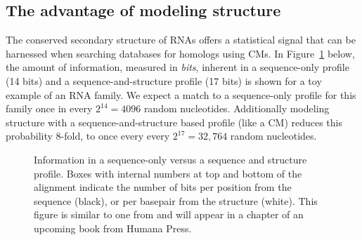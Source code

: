 \documentclass[custom,landscape,final,30pt,plainboxedsections]{sciposter-titleskipsmall}
\begin{document}
\begin{multicols}{3}
\columnbreak

\section*{The advantage of modeling structure} 
The conserved secondary structure of RNAs offers a
statistical signal that can be harnessed when searching
databases for homologs using CMs. In
Figure~\ref{fig:seqstructprofiles} below, the amount of information,
measured in \emph{bits}, inherent in a sequence-only profile (14
bits) and a sequence-and-structure profile (17 bits) is shown for a
toy example of an RNA family. We expect a match to a sequence-only
profile for this family once in every $2^{14}=4096$ random
nucleotides.  Additionally modeling structure with a
sequence-and-structure based profile (like a CM) reduces this
probability 8-fold, to once every every $2^{17}=32,764$ random
nucleotides.

\begin{footnotesize}
\begin{figure}
\caption{Information in a sequence-only versus a sequence and
  structure profile. 
  Boxes with internal numbers at top and bottom of
  the alignment indicate the number of bits per position from the
  sequence (black), or per basepair from the structure (white).
  This figure is similar to one from \cite{Eddy06b} and 
  will appear in a chapter of an upcoming book from Humana Press.
}
\label{fig:seqstructprofiles}
\end{figure}
\end{footnotesize}


\end{multicols}
\end{document}
